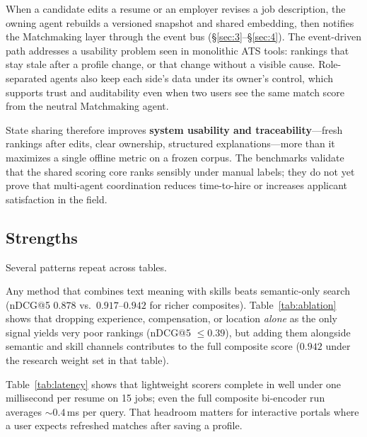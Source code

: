 When a candidate edits a resume or an employer revises a job description, the owning agent rebuilds a versioned snapshot and shared embedding, then notifies the Matchmaking layer through the event bus (\S\ref{sec:3}--\S\ref{sec:4}).
The event-driven path addresses a usability problem seen in monolithic ATS tools: rankings that stay stale after a profile change, or that change without a visible cause.
Role-separated agents also keep each side's data under its owner's control, which supports trust and auditability even when two users see the same match score from the neutral Matchmaking agent.

State sharing therefore improves \textbf{system usability and traceability}---fresh rankings after edits, clear ownership, structured explanations---more than it maximizes a single offline metric on a frozen corpus.
The benchmarks validate that the shared scoring core ranks sensibly under manual labels; they do not yet prove that multi-agent coordination reduces time-to-hire or increases applicant satisfaction in the field.

\subsection{Strengths}\label{sec:6-strengths}\label{sec:6-ablation-latency}

Several patterns repeat across tables.

Any method that combines text meaning with skills beats semantic-only search (nDCG@5 $0.878$ vs.\ $0.917$--$0.942$ for richer composites).
Table~\ref{tab:ablation} shows that dropping experience, compensation, or location \emph{alone} as the only signal yields very poor rankings (nDCG@5 $\leq 0.39$), but adding them alongside semantic and skill channels contributes to the full composite score ($0.942$ under the research weight set in that table).

\begin{JTable}

\end{JTable}

Table~\ref{tab:latency} shows that lightweight scorers complete in well under one millisecond per resume on 15 jobs; even the full composite bi-encoder run averages ${\sim}0.4$\,ms per query.
That headroom matters for interactive portals where a user expects refreshed matches after saving a profile.

\begin{JTable}

\end{JTable}


